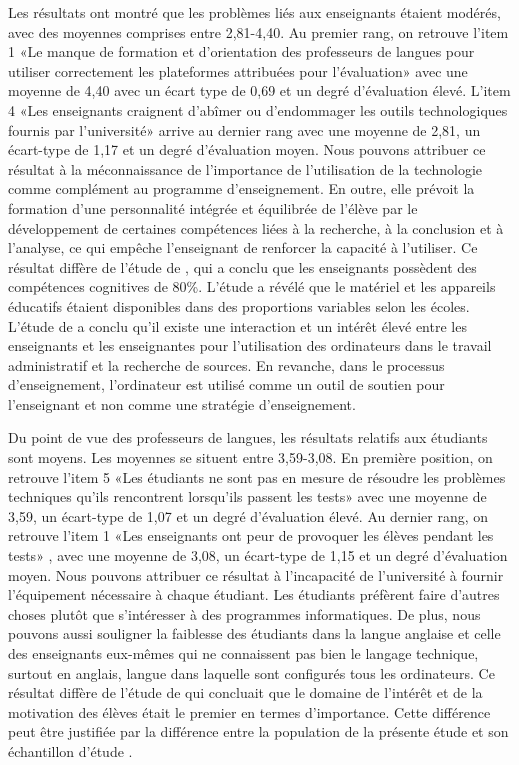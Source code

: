 \documentclass[french]{textolivre}
\begin{document}
Les résultats ont montré que les problèmes liés aux enseignants étaient modérés, avec des moyennes comprises entre 2,81-4,40. Au premier rang, on retrouve l’item 1 «Le manque de formation et d'orientation des professeurs de langues pour utiliser correctement les plateformes attribuées pour l'évaluation» avec une moyenne de 4,40 avec un écart type de 0,69 et un degré d'évaluation élevé. L’item 4 «Les enseignants craignent d’abîmer ou d'endommager les outils technologiques fournis par l'université» arrive au dernier rang avec une moyenne de 2,81, un écart-type de 1,17 et un degré d'évaluation moyen. Nous pouvons attribuer ce résultat à la méconnaissance de l'importance de l'utilisation de la technologie comme complément au programme d'enseignement. En outre, elle prévoit la formation d'une personnalité intégrée et équilibrée de l'élève par le développement de certaines compétences liées à la recherche, à la conclusion et à l'analyse, ce qui empêche l'enseignant de renforcer la capacité à l'utiliser. Ce résultat diffère de l'étude de \textcite{hou2004important}, qui a conclu que les enseignants possèdent des compétences cognitives de 80\%. L'étude \textcite{ahmed2007} a révélé que le matériel et les appareils éducatifs étaient disponibles dans des proportions variables selon les écoles. L'étude de \textcite{deborahlliza2007} a conclu qu'il existe une interaction et un intérêt élevé entre les enseignants et les enseignantes pour l'utilisation des ordinateurs dans le travail administratif et la recherche de sources. En revanche, dans le processus d'enseignement, l'ordinateur est utilisé comme un outil de soutien pour l'enseignant et non comme une stratégie d'enseignement.

Du point de vue des professeurs de langues, les résultats relatifs aux étudiants sont moyens. Les moyennes se situent entre 3,59-3,08. En première position, on retrouve l’item 5 «Les étudiants ne sont pas en mesure de résoudre les problèmes techniques qu'ils rencontrent lorsqu'ils passent les tests» avec une moyenne de 3,59, un écart-type de 1,07 et un degré d'évaluation élevé. Au dernier rang, on retrouve l’item 1 «Les enseignants ont peur de provoquer les élèves pendant les tests» , avec une moyenne de 3,08, un écart-type de 1,15 et un degré d'évaluation moyen. Nous pouvons attribuer ce résultat à l'incapacité de l'université à fournir l'équipement nécessaire à chaque étudiant. Les étudiants préfèrent faire d'autres choses plutôt que s’intéresser à des programmes informatiques. De plus, nous pouvons aussi souligner la faiblesse des étudiants dans la langue anglaise et celle des enseignants eux-mêmes qui ne connaissent pas bien le langage technique, surtout en anglais, langue dans laquelle sont configurés tous les ordinateurs. Ce résultat diffère de l'étude de \textcite{hou2004important} qui concluait que le domaine de l'intérêt et de la motivation des élèves était le premier en termes d’importance. Cette différence peut être justifiée par la différence entre la population de la présente étude et son échantillon d'étude \cite{hou2004important}.
\end{document}
